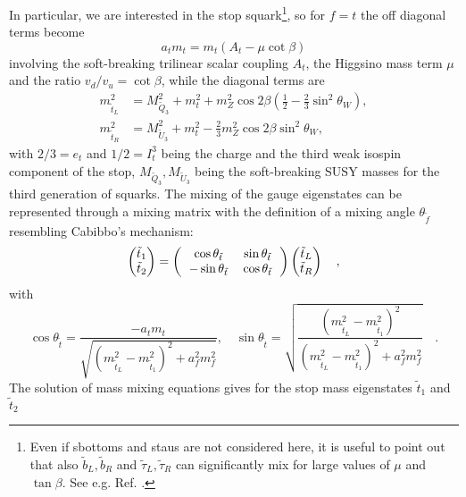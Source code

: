 In particular, we are interested in the stop squark\footnote{Even if sbottoms and staus are not considered here, it is useful to point out that also $\tilde b_L, \tilde b_R$ and $\tilde \tau_L, \tilde \tau_R$ can significantly mix for large values of $\mu$ and $\tan\beta$. See e.g. Ref. \cite{boehm-2000-61}.}, so for $f=t$ the off diagonal terms become \begin{equation}\label{eq:offDiag}
a_{t}m_{t} = m_{t}(A_{t} - \mu\cot\beta)
\end{equation}involving the soft-breaking trilinear scalar coupling $A_{t}$, the Higgsino mass term $\mu$ and the ratio $v_{d}/v_{u} = \cot\beta$, while the diagonal terms are \begin{align}
m^2_{\tilde t_L} &=   M^2_{\tilde Q_3} + m^2_t  + m_Z^2 \cos 2\beta(\tfrac{1}{2} - \tfrac{2}{3} \sin^2\theta_W), \label{eq:msfl}\\
m^2_{\tilde t_R} &=   M^2_{\tilde U_3} + m^2_t - \tfrac{2}{3} m_Z^2 \cos 2\beta \sin^2\theta_W,  \label{eq:msfr}
\end{align} with $2/3 =e_t$ and $1/2 =I^3_t$ being the charge and the third weak isospin component of the stop, $M_{\tilde Q_3},M_{\tilde U_3}$ being the soft-breaking SUSY masses for the third generation of squarks. The mixing of the gauge eigenstates can be represented through a mixing matrix with the definition of a mixing angle $\theta_{\tilde f}$ resembling Cabibbo's mechanism:\begin{equation}\label{stopMix}
\begin{pmatrix} \tilde{t}_{1} \\ \tilde{t}_{2} \end{pmatrix}  = {\setlength\arraycolsep{6pt}
\left( \begin{array}{cc}
\cos\theta_{\tilde t} & \sin\theta_{\tilde t}\\
-\sin\theta_{\tilde t}& \cos\theta_{\tilde t}
\end{array}\right)}  \begin{pmatrix} \tilde{t}_{L} \\ \tilde{t}_{R} \end{pmatrix} \quad ,
\end{equation} with\begin{equation}\label{stopMixAngles}
\cos\theta_{\tilde t} = \dfrac{-a_t m_t}{\sqrt{(m^2_{\tilde{t}_{L}} - m^2_{\tilde{t}_{1}})^2 + a_f^2m_f^2}} ,\quad \sin\theta_{\tilde t}= \sqrt{\dfrac{(m^2_{\tilde{t}_{L}} - m^2_{\tilde{t}_{1}})^2}{(m^2_{\tilde{t}_{L}} - m^2_{\tilde{t}_{1}})^2 + a_f^2m_f^2}}\quad .\end{equation} The solution of mass mixing equations gives for the stop mass eigenstates $\tilde{t}_{1}$ and $\tilde{t}_{2}$ \cite{bartl-1997-73,bartl-1997-76}\begin{equation}

\end{equation}
